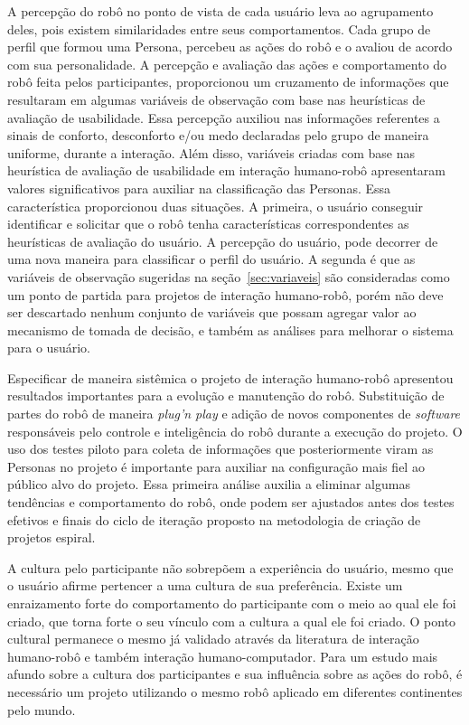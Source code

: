 A percepção do robô no ponto de vista de cada usuário leva ao agrupamento deles, pois existem similaridades entre seus comportamentos. Cada grupo de perfil que formou uma Persona, percebeu as ações do robô e o avaliou de acordo com sua personalidade. A percepção e avaliação das ações e comportamento do robô feita pelos participantes, proporcionou um cruzamento de informações que resultaram em algumas variáveis de observação com base nas heurísticas de avaliação de usabilidade. Essa percepção auxiliou nas informações referentes a sinais de conforto, desconforto e/ou medo declaradas pelo grupo de maneira uniforme, durante a interação. Além disso, variáveis criadas com base nas heurística de avaliação de usabilidade em interação humano-robô apresentaram valores significativos para auxiliar na classificação das Personas. Essa característica proporcionou duas situações. A primeira, o usuário conseguir identificar e solicitar que o robô tenha características correspondentes as heurísticas de avaliação do usuário. A percepção do usuário, pode decorrer de uma nova maneira para classificar o perfil do usuário. A segunda é que as variáveis de observação sugeridas na seção~\ref{sec:variaveis} são consideradas como um ponto de partida para projetos de interação humano-robô, porém não deve ser descartado nenhum conjunto de variáveis que possam agregar valor ao mecanismo de tomada de decisão, e também as análises para melhorar o sistema para o usuário.

Especificar de maneira sistêmica o projeto de interação humano-robô apresentou resultados importantes para a evolução e manutenção do robô. Substituição de partes do robô de maneira \emph{plug'n play} e adição de novos componentes de \emph{software} responsáveis pelo controle e inteligência do robô durante a execução do projeto. O uso dos testes piloto para coleta de informações que posteriormente viram as Personas no projeto é importante para auxiliar na configuração mais fiel ao público alvo do projeto. Essa primeira análise auxilia a eliminar algumas tendências e comportamento do robô, onde podem ser ajustados antes dos testes efetivos e finais do ciclo de iteração proposto na metodologia de criação de projetos espiral.

A cultura pelo participante não sobrepõem a experiência do usuário, mesmo que o usuário afirme pertencer a uma cultura de sua preferência. Existe um enraizamento forte do comportamento do participante com o meio ao qual ele foi criado, que torna forte o seu vínculo com a cultura a qual ele foi criado. O ponto cultural permanece o mesmo já validado através da literatura de interação humano-robô e também interação humano-computador. Para um estudo mais afundo sobre a cultura dos participantes e sua influência sobre as ações do robô, é necessário um projeto utilizando o mesmo robô aplicado em diferentes continentes pelo mundo.

